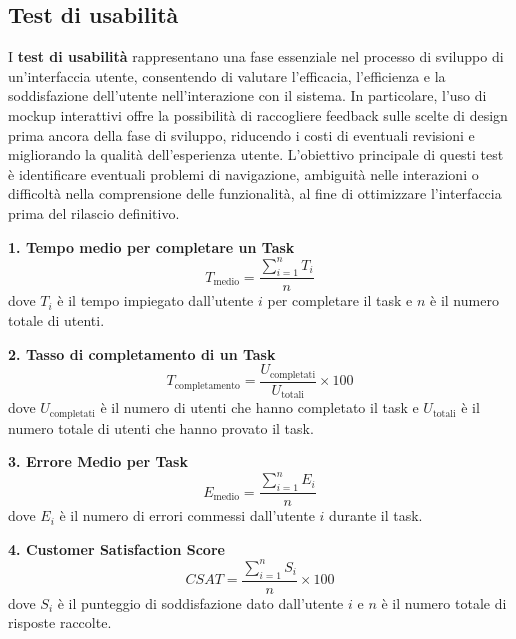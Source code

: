 \subsection{Test di usabilità}

I \textbf{test di usabilità} rappresentano una fase essenziale nel processo di sviluppo di un’interfaccia utente, consentendo di valutare l'efficacia, l’efficienza e la soddisfazione dell’utente nell’interazione con il sistema. In particolare, l'uso di mockup interattivi offre la possibilità di raccogliere feedback sulle scelte di design prima ancora della fase di sviluppo, riducendo i costi di eventuali revisioni e migliorando la qualità dell’esperienza utente.
\newline
L'obiettivo principale di questi test è identificare eventuali problemi di navigazione, ambiguità nelle interazioni o difficoltà nella comprensione delle funzionalità, al fine di ottimizzare l'interfaccia prima del rilascio definitivo. 

\vspace{0.5cm} %

\textbf{1. Tempo medio per completare un Task}
\begin{equation}
T_{\text{medio}} = \frac{\sum_{i=1}^{n} T_i}{n}
\end{equation}
dove \( T_i \) è il tempo impiegato dall'utente \( i \) per completare il task e \( n \) è il numero totale di utenti.

\vspace{0.5cm} %
\textbf{2. Tasso di completamento di un Task}
\begin{equation}
T_{\text{completamento}} = \frac{U_{\text{completati}}}{U_{\text{totali}}} \times 100
\end{equation}
dove \( U_{\text{completati}} \) è il numero di utenti che hanno completato il task e \( U_{\text{totali}} \) è il numero totale di utenti che hanno provato il task.

\vspace{0.5cm} %
\textbf{3. Errore Medio per Task}
\begin{equation}
E_{\text{medio}} = \frac{\sum_{i=1}^{n} E_i}{n}
\end{equation}
dove \( E_i \) è il numero di errori commessi dall'utente \( i \) durante il task.

\vspace{0.5cm} %
\textbf{4. Customer Satisfaction Score}
\begin{equation}
CSAT = \frac{\sum_{i=1}^{n} S_i}{n} \times 100
\end{equation}
dove \( S_i \) è il punteggio di soddisfazione dato dall'utente \( i \) e \( n \) è il numero totale di risposte raccolte.

